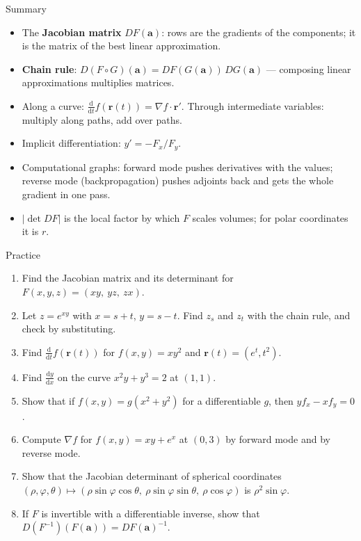 \documentclass[10pt]{wosm-slides}
\newcommand{\va}{\mathbf{a}}
\newcommand{\vr}{\mathbf{r}}
\begin{document}
\begin{frame}{Summary}
  \begin{itemize}
    \item The \textbf{Jacobian matrix} $DF(\va)$: rows are the gradients of the components; it is the
      matrix of the best linear approximation.
    \item \textbf{Chain rule}: $D(F \circ G)(\va) = DF(G(\va))\, DG(\va)$ --- composing linear
      approximations multiplies matrices.
    \item Along a curve: $\frac{\mathrm d}{\mathrm dt} f(\vr(t)) = \nabla f \cdot \vr'$. Through
      intermediate variables: multiply along paths, add over paths.
    \item Implicit differentiation: $y' = -F_x / F_y$.
    \item Computational graphs: forward mode pushes derivatives with the values; reverse mode
      (backpropagation) pushes adjoints back and gets the whole gradient in one pass.
    \item $|\det DF|$ is the local factor by which $F$ scales volumes; for polar coordinates it is $r$.
  \end{itemize}
\end{frame}

\begin{frame}{Practice}
  \small
  \begin{enumerate}
    \item Find the Jacobian matrix and its determinant for $F(x, y, z) = (xy, \ yz, \ zx)$.
    \item Let $z = e^{xy}$ with $x = s + t$, $y = s - t$. Find $z_s$ and $z_t$ with the chain rule, and
      check by substituting.
    \item Find $\frac{\mathrm d}{\mathrm dt} f(\vr(t))$ for $f(x, y) = xy^2$ and $\vr(t) = (e^t, t^2)$.
    \item Find $\frac{\mathrm dy}{\mathrm dx}$ on the curve $x^2 y + y^3 = 2$ at $(1, 1)$.
    \item Show that if $f(x, y) = g(x^2 + y^2)$ for a differentiable $g$, then $y f_x - x f_y = 0$.
    \item Compute $\nabla f$ for $f(x, y) = xy + e^x$ at $(0, 3)$ by forward mode and by reverse mode.
    \item Show that the Jacobian determinant of spherical coordinates
      $(\rho, \varphi, \theta) \mapsto (\rho\sin\varphi\cos\theta, \ \rho\sin\varphi\sin\theta, \ \rho\cos\varphi)$
      is $\rho^2 \sin\varphi$.
    \item If $F$ is invertible with a differentiable inverse, show that
      $D(F^{-1})(F(\va)) = DF(\va)^{-1}$.
  \end{enumerate}
\end{frame}
\end{document}
